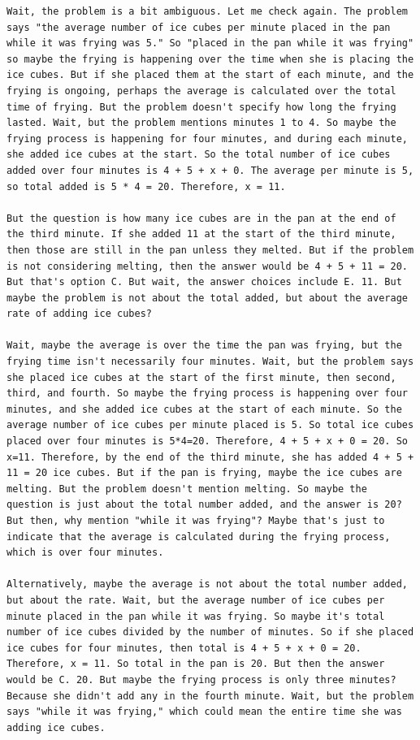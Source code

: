 \documentclass{article}
\theoremstyle{plain}
\theoremstyle{definition}
\theoremstyle{remark}
\begin{document}
\begin{lstlisting}
Wait, the problem is a bit ambiguous. Let me check again. The problem says "the average number of ice cubes per minute placed in the pan while it was frying was 5." So "placed in the pan while it was frying" so maybe the frying is happening over the time when she is placing the ice cubes. But if she placed them at the start of each minute, and the frying is ongoing, perhaps the average is calculated over the total time of frying. But the problem doesn't specify how long the frying lasted. Wait, but the problem mentions minutes 1 to 4. So maybe the frying process is happening for four minutes, and during each minute, she added ice cubes at the start. So the total number of ice cubes added over four minutes is 4 + 5 + x + 0. The average per minute is 5, so total added is 5 * 4 = 20. Therefore, x = 11.

But the question is how many ice cubes are in the pan at the end of the third minute. If she added 11 at the start of the third minute, then those are still in the pan unless they melted. But if the problem is not considering melting, then the answer would be 4 + 5 + 11 = 20. But that's option C. But wait, the answer choices include E. 11. But maybe the problem is not about the total added, but about the average rate of adding ice cubes?

Wait, maybe the average is over the time the pan was frying, but the frying time isn't necessarily four minutes. Wait, but the problem says she placed ice cubes at the start of the first minute, then second, third, and fourth. So maybe the frying process is happening over four minutes, and she added ice cubes at the start of each minute. So the average number of ice cubes per minute placed is 5. So total ice cubes placed over four minutes is 5*4=20. Therefore, 4 + 5 + x + 0 = 20. So x=11. Therefore, by the end of the third minute, she has added 4 + 5 + 11 = 20 ice cubes. But if the pan is frying, maybe the ice cubes are melting. But the problem doesn't mention melting. So maybe the question is just about the total number added, and the answer is 20? But then, why mention "while it was frying"? Maybe that's just to indicate that the average is calculated during the frying process, which is over four minutes.

Alternatively, maybe the average is not about the total number added, but about the rate. Wait, but the average number of ice cubes per minute placed in the pan while it was frying. So maybe it's total number of ice cubes divided by the number of minutes. So if she placed ice cubes for four minutes, then total is 4 + 5 + x + 0 = 20. Therefore, x = 11. So total in the pan is 20. But then the answer would be C. 20. But maybe the frying process is only three minutes? Because she didn't add any in the fourth minute. Wait, but the problem says "while it was frying," which could mean the entire time she was adding ice cubes.


\end{lstlisting}
\end{document}
